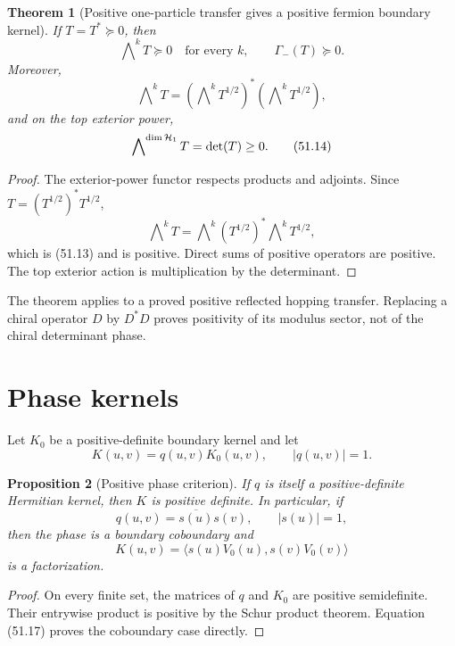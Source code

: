 \documentclass[11pt]{article}
\newtheorem{theorem}{Theorem}[section]
\newtheorem{proposition}[theorem]{Proposition}
\theoremstyle{remark}
\begin{document}
\begin{theorem}[Positive one-particle transfer gives a positive
fermion boundary kernel]
\label{thm:v15v51-fermion}
If \(T=T^*\succeq0\), then
\[
 \bigwedge\nolimits^kT\succeq0
 \quad\text{for every }k,\qquad
 \Gamma_-(T)\succeq0.                                   \tag{51.12}
\]
Moreover,
\[
 \bigwedge\nolimits^kT
 =
 \left(\bigwedge\nolimits^kT^{1/2}\right)^*
 \left(\bigwedge\nolimits^kT^{1/2}\right),              \tag{51.13}
\]
and on the top exterior power,
\[
 \bigwedge\nolimits^{\dim{\cal H}_1}T=\det(T)\geq0.      \tag{51.14}
\]
\end{theorem}

\begin{proof}
The exterior-power functor respects products and adjoints.  Since
\(T=(T^{1/2})^*T^{1/2}\),
\[
 \bigwedge\nolimits^kT
 =
 \bigwedge\nolimits^k(T^{1/2})^*
 \bigwedge\nolimits^kT^{1/2},
\]
which is (51.13) and is positive.  Direct sums of positive operators
are positive.  The top exterior action is multiplication by the
determinant.
\end{proof}

The theorem applies to a proved positive reflected hopping transfer.
Replacing a chiral operator \(D\) by \(D^*D\) proves positivity of
its modulus sector, not of the chiral determinant phase.

\section{Phase kernels}

Let \(K_0\) be a positive-definite boundary kernel and let
\[
 K(u,v)=q(u,v)K_0(u,v),\qquad |q(u,v)|=1.               \tag{51.15}
\]

\begin{proposition}[Positive phase criterion]
\label{prop:v15v51-phase}
If \(q\) is itself a positive-definite Hermitian kernel, then \(K\)
is positive definite.  In particular, if
\[
 q(u,v)=\overline{s(u)}s(v),\qquad |s(u)|=1,             \tag{51.16}
\]
then the phase is a boundary coboundary and
\[
 K(u,v)=
 \langle s(u)V_0(u),s(v)V_0(v)\rangle                  \tag{51.17}
\]
is a factorization.
\end{proposition}

\begin{proof}
On every finite set, the matrices of \(q\) and \(K_0\) are positive
semidefinite.  Their entrywise product is positive by the Schur
product theorem.  Equation (51.17) proves the coboundary case
directly.
\end{proof}
\end{document}
